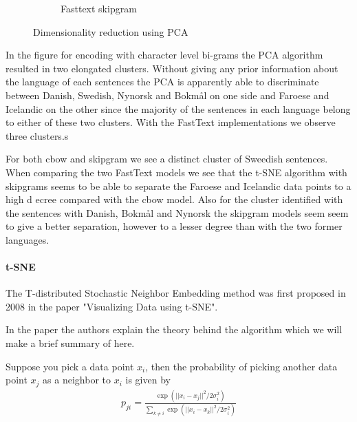 \begin{figure}[h!]
\begin{subfigure}[b]{0.47\textwidth}
        \caption{Fasttext skipgram}
    \end{subfigure}
    \caption{Dimensionality reduction using PCA}
    \label{pca}
\end{figure}

In the figure for encoding with character level bi-grams the PCA algorithm resulted in two elongated clusters. Without giving any prior information about the language of each sentences the PCA is apparently able to discriminate between Danish, Swedish, Nynorsk and Bokmål on one side and Faroese and Icelandic on the other since the majority of the sentences in each language belong to either of these two clusters. With the FastText implementations we observe three clusters.s

For both cbow and skipgram we see a distinct cluster of Sweedish sentences. When comparing the two FastText models we see that the t-SNE algorithm with skipgrams seems to be able to separate the Faroese and Icelandic data points to a high d ecree compared with the cbow model. Also for the cluster identified with the sentences with Danish, Bokmål and Nynorsk the skipgram models seem seem to give a better separation, however to a lesser degree than with the two former languages.

\paragraph{t-SNE}

The T-distributed Stochastic Neighbor Embedding method was first proposed in 2008 in the paper "Visualizing Data using t-SNE"\cite{tsne}.

In the paper the authors explain the theory behind the algorithm which we  will make a brief summary of here.

Suppose you pick a data point $x_i$, then the probability of picking another data point $x_j$ as a neighbor to $x_i$ is given by
\begin{align}
p_{ji}= \frac{\exp (|| x_i - x_j ||^2/2\sigma_i^2 )}{\sum_{k\neq i} \exp (|| x_i - x_k ||^2/2\sigma_i^2 )}
\end{align}


